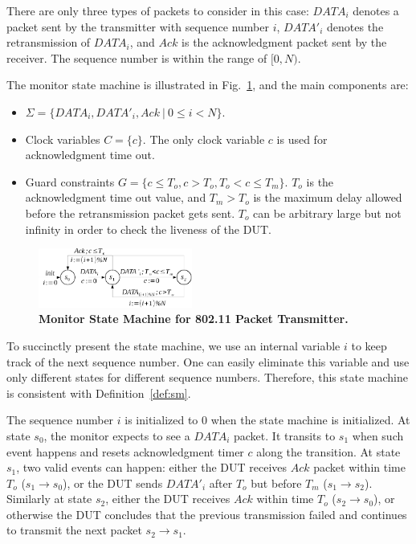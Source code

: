 There are only three types of packets to consider in this case: $DATA_i$ denotes
a packet sent by the transmitter with sequence number $i$, $DATA'_i$ denotes the
retransmission of $DATA_i$, and $Ack$ is the acknowledgment packet sent by the
receiver.
%
The sequence number is within the range of $[0, N)$.


The monitor state machine is illustrated in Fig.~\ref{fig:dot11_tx_ta}, and
the main components are:

\begin{itemize}
  \item $\Sigma = \{DATA_i, DATA'_i, Ack\ |\ 0 \le i < N\}$.
  \item Clock variables $C = \{c\}$. The only clock variable $c$ is
    used for acknowledgment time out.
  \item Guard constraints $G = \{ c \le T_o, c > T_o, T_o < c \le T_m\}$.
    $T_o$ is the acknowledgment time out value, and $T_m >
    T_o$ is the maximum delay allowed before the retransmission packet gets
    sent. $T_o$ can be arbitrary large but not infinity in order to check the
    liveness of the DUT.
\end{itemize}

\begin{figure}
  \vspace*{-14mm}
  \centering
  \includegraphics[width=0.45\textwidth]{./figures/dot11_tx_ta.pdf}
  \caption{\textbf{Monitor State Machine for 802.11 Packet Transmitter.}}
  \label{fig:dot11_tx_ta}
  \vspace*{-8mm}
\end{figure}


To succinctly present the state machine, we use an internal variable $i$ to keep
track of the next sequence number.
%
One can easily eliminate this variable and
use only different states for different sequence numbers.
%
Therefore, this state machine is consistent with Definition~\ref{def:sm}.



The sequence number $i$ is initialized to 0 when the state machine is
initialized.
%
At state $s_0$, the monitor expects to see a $DATA_i$ packet.
%
It transits to $s_1$ when such event happens and resets acknowledgment timer $c$ along the transition.
%
At state $s_1$, two valid events can happen: either the DUT receives $Ack$ packet
within time $T_o$ ($s_1\rightarrow s_0$), or the DUT sends $DATA'_i$ after $T_o$
but before $T_m$ ($s_1 \rightarrow s_2$).
%
Similarly at state $s_2$, either the DUT receives $Ack$ within time $T_o$ ($s_2
\rightarrow s_0$), or otherwise the DUT concludes that the previous transmission
failed and continues to transmit the next packet $s_2\rightarrow s_1$.

